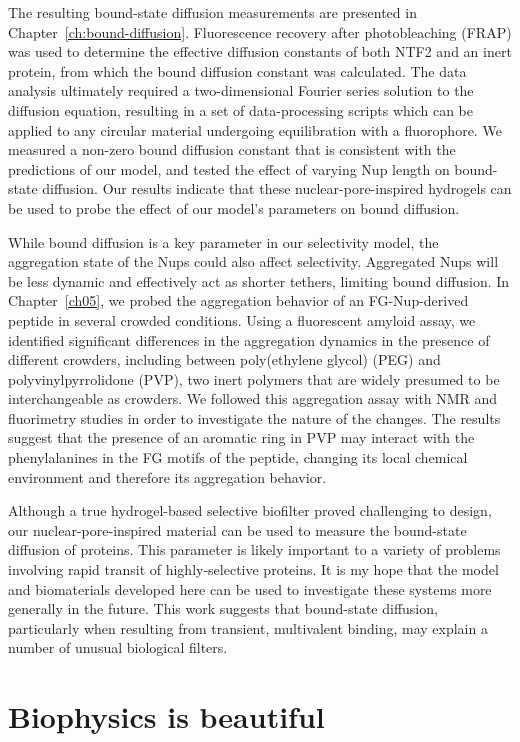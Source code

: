 The resulting bound-state diffusion measurements are presented in Chapter~\ref{ch:bound-diffusion}.  Fluorescence recovery after photobleaching (FRAP) was used to determine the effective diffusion constants of both NTF2 and an inert protein, from which the bound diffusion constant was calculated.  The data analysis ultimately required a two-dimensional Fourier series solution to the diffusion equation, resulting in a set of data-processing scripts which can be applied to any circular material undergoing equilibration with a fluorophore.  We measured a non-zero bound diffusion constant that is consistent with the predictions of our model, and tested the effect of varying Nup length on bound-state diffusion.  Our results indicate that these nuclear-pore-inspired hydrogels can be used to probe the effect of our model's parameters on bound diffusion.

While bound diffusion is a key parameter in our selectivity model, the aggregation state of the Nups could also affect selectivity.  Aggregated Nups will be less dynamic and effectively act as shorter tethers, limiting bound diffusion.  In Chapter~\ref{ch05}, we probed the aggregation behavior of an FG-Nup-derived peptide in several crowded conditions.  Using a fluorescent amyloid assay, we identified significant differences in the aggregation dynamics in the presence of different crowders, including between poly(ethylene glycol) (PEG) and polyvinylpyrrolidone (PVP), two inert polymers that are widely presumed to be interchangeable as crowders.  We followed this aggregation assay with NMR and fluorimetry studies in order to investigate the nature of the changes.  The results suggest that the presence of an aromatic ring in PVP may interact with the phenylalanines in the FG motifs of the peptide, changing its local chemical environment and therefore its aggregation behavior.

Although a true hydrogel-based selective biofilter proved challenging to design, our nuclear-pore-inspired material can be used to measure the bound-state diffusion of proteins.  This parameter is likely important to a variety of problems involving rapid transit of highly-selective proteins.  It is my hope that the model and biomaterials developed here can be used to investigate these systems more generally in the future.  This work suggests that bound-state diffusion, particularly when resulting from transient, multivalent binding, may explain a number of unusual biological filters.

\section{Biophysics is beautiful}

